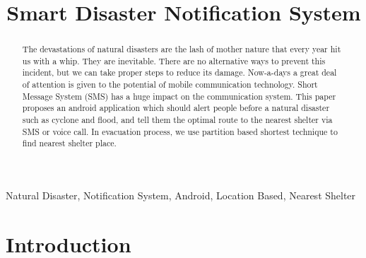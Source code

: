 \documentclass[conference]{IEEEtran}
\title{Smart Disaster Notification System}
\begin{document}
%




\author{
}

\maketitle


\begin{abstract}
The devastations of natural disasters are the lash of mother nature that every year hit us with a whip. They are inevitable. There are no alternative ways to prevent this incident, but we can take proper steps to reduce its damage. Now-a-days a great deal of attention is given to the potential of mobile communication technology. Short Message System (SMS) has a huge impact on the communication system. This paper proposes an android application which should alert people before a natural disaster such as cyclone and flood, and tell them the optimal route to the nearest shelter via SMS or voice call. In evacuation process, we use partition based shortest technique to find nearest shelter place. %

\end{abstract}

\begin{IEEEkeywords}
Natural Disaster, Notification System, Android, Location Based, Nearest Shelter
\end{IEEEkeywords}

\IEEEpeerreviewmaketitle
\section{Introduction}
\label{sec:Intro}
\end{document}
